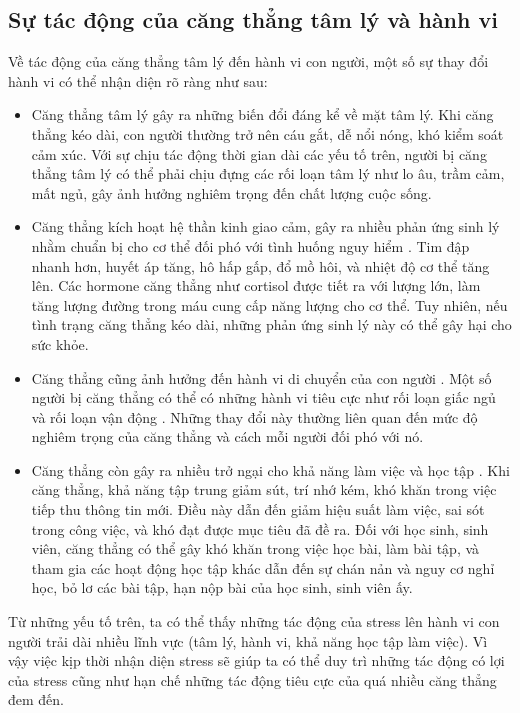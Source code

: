 \subsection{Sự tác động của căng thẳng tâm lý và hành vi}
Về tác động của căng thẳng tâm lý đến hành vi con người, một số sự thay đổi hành vi có thể nhận diện rõ ràng như sau:
\begin{itemize}
    \item Căng thẳng tâm lý gây ra những biến đổi đáng kể về mặt tâm lý. Khi căng thẳng kéo dài, con người thường trở nên cáu gắt, dễ nổi nóng, khó kiểm soát cảm xúc. Với sự chịu tác động thời gian dài các yếu tố trên, người bị căng thẳng tâm lý có thể phải chịu đựng các rối loạn tâm lý như lo âu, trầm cảm, mất ngủ, gây ảnh hưởng nghiêm trọng đến chất lượng cuộc sống.
    \item Căng thẳng kích hoạt hệ thần kinh giao cảm, gây ra nhiều phản ứng sinh lý nhằm chuẩn bị cho cơ thể đối phó với tình huống nguy hiểm \cite{Youngjun, Alan}. Tim đập nhanh hơn, huyết áp tăng, hô hấp gấp, đổ mồ hôi, và nhiệt độ cơ thể tăng lên. Các hormone căng thẳng như cortisol được tiết ra với lượng lớn, làm tăng lượng đường trong máu cung cấp năng lượng cho cơ thể. Tuy nhiên, nếu tình trạng căng thẳng kéo dài, những phản ứng sinh lý này có thể gây hại cho sức khỏe.
    \item Căng thẳng cũng ảnh hưởng đến hành vi di chuyển của con người \cite{student_life2,student_life3, student_life4,eustress_distress4}. Một số người bị căng thẳng có thể có những hành vi tiêu cực như rối loạn giấc ngủ và rối loạn vận động \cite{eustress_distress4}. Những thay đổi này thường liên quan đến mức độ nghiêm trọng của căng thẳng và cách mỗi người đối phó với nó.
    \item Căng thẳng còn gây ra nhiều trở ngại cho khả năng làm việc và học tập \cite{stress_workload,eustress_distress3}. Khi căng thẳng, khả năng tập trung giảm sút, trí nhớ kém, khó khăn trong việc tiếp thu thông tin mới. Điều này dẫn đến giảm hiệu suất làm việc, sai sót trong công việc, và khó đạt được mục tiêu đã đề ra. Đối với học sinh, sinh viên, căng thẳng có thể gây khó khăn trong việc học bài, làm bài tập, và tham gia các hoạt động học tập khác dẫn đến sự chán nản và nguy cơ nghỉ học, bỏ lơ các bài tập, hạn nộp bài của học sinh, sinh viên ấy.
\end{itemize}

Từ những yếu tố trên, ta có thể thấy những tác động của stress lên hành vi con người trải dài nhiều lĩnh vực (tâm lý, hành vi, khả năng học tập làm việc). Vì vậy việc kịp thời nhận diện stress sẽ giúp ta có thể duy trì những tác động có lợi của stress cũng như hạn chế những tác động tiêu cực của quá nhiều căng thẳng đem đến. 

